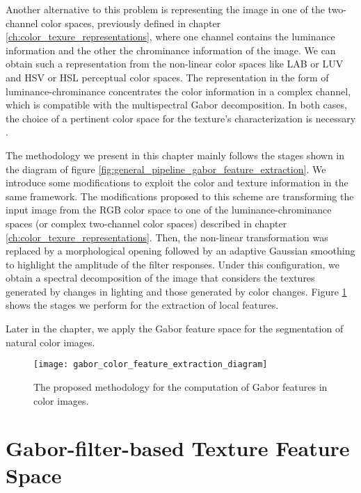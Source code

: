 Another alternative to this problem is representing the image in one of the two-channel color spaces, previously defined in chapter \ref{ch:color_texure_representations}, where one channel contains the luminance information and the other the chrominance information of the image. We can obtain such a representation from the non-linear color spaces like LAB or LUV and HSV or HSL perceptual color spaces. The representation in the form of luminance-chrominance concentrates the color information in a complex channel, which is compatible with the multispectral Gabor decomposition. In both cases, the choice of a pertinent color space for the texture's characterization is necessary \citep{Qazi.Alata.ea:PR:2011}.

The methodology we present in this chapter mainly follows the stages shown in the diagram of figure \ref{fig:general_pipeline_gabor_feature_extraction}. We introduce some modifications to exploit the color and texture information in the same framework. The modifications proposed to this scheme are transforming the input image from the RGB color space to one of the luminance-chrominance spaces (or complex two-channel color spaces) described in chapter \ref{ch:color_texure_representations}. Then, the non-linear transformation was replaced by a morphological opening followed by an adaptive Gaussian smoothing to highlight the amplitude of the filter responses. Under this configuration, we obtain a spectral decomposition of the image that considers the textures generated by changes in lighting and those generated by color changes. Figure \ref{fig:proposed_pipeline_gabor_feature_extraction} shows the stages we perform for the extraction of local features.

Later in the chapter, we apply the Gabor feature space for the segmentation of natural color images. 

\begin{figure}[!ht]
	\centering
	\texttt{[image: gabor\_color\_feature\_extraction\_diagram]}
	\caption{The proposed methodology for the computation of Gabor features in color images.}\label{fig:proposed_pipeline_gabor_feature_extraction}
\end{figure}

\section{Gabor-filter-based Texture Feature Space}

